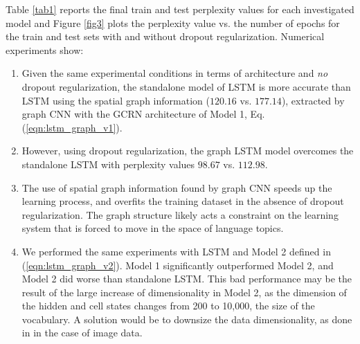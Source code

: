 \documentclass{article}
\newcommand{\eqnref}[1]{(\ref{eqn:#1})}
\begin{document}
Table \ref{tab1} reports the final train and test perplexity values for each
investigated model and Figure \ref{fig3} plots the perplexity value vs. the
number of epochs for the train and test sets with and without dropout
regularization. Numerical experiments show:
\begin{enumerate}
\item Given the same experimental conditions in terms of architecture and {\it
	no} dropout regularization, the standalone model of LSTM is more accurate
	than LSTM using the spatial graph information ($120.16$ vs. $177.14$),
	extracted by graph CNN with the GCRN architecture of Model 1, Eq.
	\eqnref{lstm_graph_v1}. 
\item However, using dropout regularization, the graph LSTM model overcomes the
	standalone LSTM with perplexity values $98.67$ vs. $112.98$. 
\item The use of spatial graph information found by graph CNN speeds up the
	learning process, and overfits the training dataset in the absence of
	dropout regularization. The graph structure likely acts a constraint on the
	learning system that is forced to move in the space of language topics.
\item We performed the same experiments with LSTM and Model 2 defined in
	\eqnref{lstm_graph_v2}. Model 1 significantly outperformed Model 2, and
	Model 2 did worse than standalone LSTM. This bad performance may be the
	result of the large increase of dimensionality in Model 2, as the dimension
	of the hidden and cell states changes from 200 to 10,000, the size of the
	vocabulary. A solution would be to downsize the data dimensionality, as
	done in \cite{convlstm} in the case of image data.
\end{enumerate}

\end{document}
